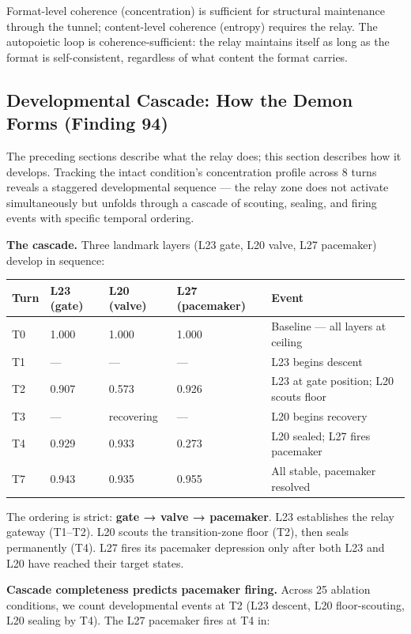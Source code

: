 \documentclass[12pt]{article}
\begin{document}
Format-level coherence (concentration) is sufficient for structural maintenance through the tunnel; content-level coherence (entropy) requires the relay. The autopoietic loop is coherence-sufficient: the relay maintains itself as long as the format is self-consistent, regardless of what content the format carries.

\subsection{Developmental Cascade: How the Demon Forms (Finding 94)}

The preceding sections describe what the relay does; this section describes how it develops. Tracking the intact condition's concentration profile across 8 turns reveals a staggered developmental sequence — the relay zone does not activate simultaneously but unfolds through a cascade of scouting, sealing, and firing events with specific temporal ordering.

\textbf{The cascade.} Three landmark layers (L23 gate, L20 valve, L27 pacemaker) develop in sequence:

\begin{table}[h]
\centering
\small
\begin{tabular}{lllll}
\toprule
\textbf{Turn} & \textbf{L23 (gate)} & \textbf{L20 (valve)} & \textbf{L27 (pacemaker)} & \textbf{Event} \\
\midrule
T0 & 1.000 & 1.000 & 1.000 & Baseline — all layers at ceiling \\
T1 & — & — & — & L23 begins descent \\
T2 & 0.907 & 0.573 & 0.926 & L23 at gate position; L20 scouts floor \\
T3 & — & recovering & — & L20 begins recovery \\
T4 & 0.929 & 0.933 & 0.273 & L20 sealed; L27 fires pacemaker \\
T7 & 0.943 & 0.935 & 0.955 & All stable, pacemaker resolved \\
\bottomrule
\end{tabular}
\end{table}


The ordering is strict: \textbf{gate → valve → pacemaker}. L23 establishes the relay gateway (T1–T2). L20 scouts the transition-zone floor (T2), then seals permanently (T4). L27 fires its pacemaker depression only after both L23 and L20 have reached their target states.

\textbf{Cascade completeness predicts pacemaker firing.} Across 25 ablation conditions, we count developmental events at T2 (L23 descent, L20 floor-scouting, L20 sealing by T4). The L27 pacemaker fires at T4 in:
\end{document}
